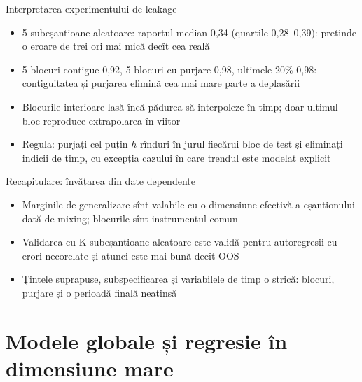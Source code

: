 \begin{frame}{Interpretarea experimentului de leakage}
\itemsize{\small}
\begin{itemize}
    \item 5 subeșantioane aleatoare: raportul median 0{,}34 (quartile 0{,}28--0{,}39): pretinde o eroare de trei ori mai mică decît cea reală
    \item 5 blocuri contigue 0{,}92, 5 blocuri cu purjare 0{,}98, ultimele 20\% 0{,}98: contiguitatea și purjarea elimină cea mai mare parte a deplasării
    \item Blocurile interioare lasă încă pădurea să interpoleze în timp; doar ultimul bloc reproduce extrapolarea în viitor
    \item Regula: purjați cel puțin $h$ rînduri în jurul fiecărui bloc de test și eliminați indicii de timp, cu excepția cazului în care trendul este modelat explicit
\end{itemize}
\end{frame}

\begin{frame}{Recapitulare: învățarea din date dependente}
\itemsize{\small}
\begin{itemize}
    \item Marginile de generalizare sînt valabile cu o dimensiune efectivă a eșantionului dată de mixing; blocurile sînt instrumentul comun
    \item Validarea cu K subeșantioane aleatoare este validă pentru autoregresii cu erori necorelate și atunci este mai bună decît OOS
    \item Țintele suprapuse, subspecificarea și variabilele de timp o strică: blocuri, purjare și o perioadă finală neatinsă
\end{itemize}
\end{frame}


\section{Modele globale și regresie în dimensiune mare}

